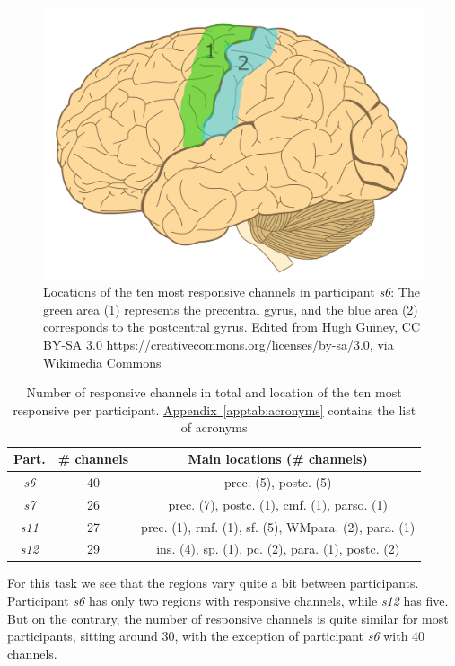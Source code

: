 \documentclass[10pt,conference,compsocconf]{IEEEtran}
\newcommand{\aref}[1]{\hyperref[#1]{Appendix~\ref*{#1}}}
\begin{document}
\begin{figure}[h!]
    \center
    \includegraphics[width=0.8\linewidth]{images/Human-brain.png}
    \caption{Locations of the ten most responsive channels in participant \textit{s6}: The green area (1) represents the precentral gyrus, and the blue area (2) corresponds to the postcentral gyrus. Edited from Hugh Guiney, CC BY-SA 3.0 \url{https://creativecommons.org/licenses/by-sa/3.0}, via Wikimedia Commons}
    \label{fig:s6actionrecogchannels}
\end{figure}
\FloatBarrier

\begin{table}[h!]
    \centering
    \begin{tabular}{| c | c | c |}
        \hline
        Part. & \# channels & Main locations (\# channels) \\
        \hline
        \textit{s6} & 40 & prec. (5), postc. (5) \\
        \hline
        \textit{s7} & 26 & prec. (7), postc. (1), cmf. (1), parso. (1) \\
        \hline
        \textit{s11} & 27 & prec. (1),  rmf. (1), sf. (5), WMpara. (2), para. (1) \\
        \hline
        \textit{s12} & 29 & ins. (4), sp. (1), pc. (2), para. (1), postc. (2) \\
        \hline
    \end{tabular}
    \caption{Number of responsive channels in total and location of the ten most responsive per participant. \aref{apptab:acronyms} contains the list of acronyms}
    \label{tab:actionrecogchannellocations}
\end{table}

For this task we see that the regions vary quite a bit between participants. Participant \textit{s6} has only two regions with responsive channels, while \textit{s12} has five. But on the contrary, the number of responsive channels is quite similar for most participants, sitting around 30, with the exception of participant \textit{s6} with 40 channels.
\end{document}
